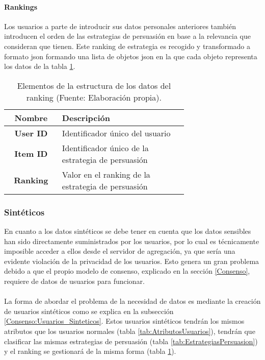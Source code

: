 \paragraph{Rankings\\}
Los usuarios a parte de introducir sus datos personales anteriores también introducen el orden de las estrategias de persuasión en base a la relevancia que consideran que tienen. Este ranking de estrategia es recogido y transformado a formato json formando una lista de objetos json en la que cada objeto representa los datos de la tabla \ref{tab:RankingUsuario}.
\begin{table}[H]
    \begin{center}
        \begin{tabular}{|c|p{0.7\linewidth}|}
            \hline
            \rowcolor{Cyan} 
            \textbf{Nombre} & \textbf{Descripción}\\ 
            \hline
            \textbf{User ID}  & Identificador único del usuario\\
            \hline
            \rowcolor{GrisTabla}
            \textbf{Item ID}  & Identificador único de la estrategia de persuasión\\
            \hline
            \textbf{Ranking} & Valor en el ranking de la estrategia de persuasión\\
            \hline
        \end{tabular}
        \caption{\centering Elementos de la estructura de los datos del ranking  (Fuente: Elaboración propia).}
        \label{tab:RankingUsuario}
    \end{center}    
\end{table}


\subsubsection{Sintéticos}
En cuanto a los datos sintéticos se debe tener en cuenta que los datos sensibles han sido directamente suministrados por los usuarios, por lo cual es técnicamente imposible acceder a ellos desde el servidor de agregación, ya que sería una evidente violación de la privacidad de los usuarios. Esto genera un gran problema debido a que el propio modelo de consenso, explicado en la sección \ref{Consenso}, requiere de datos de usuarios para funcionar.
\\ \\
La forma de abordar el problema de la necesidad de datos es mediante la creación de usuarios sintéticos como se explica en la subsección \ref{Consenso:Usuarios_Sinteticos}. Estos usuarios sintéticos tendrán los mismos atributos que los usuarios normales (tabla \ref{tab:AtributosUsuarios}), tendrán que clasificar las mismas estrategias de persuasión (tabla \ref{tab:EstrategiasPersuasion}) y el ranking se gestionará de la misma forma (tabla \ref{tab:RankingUsuario}).
